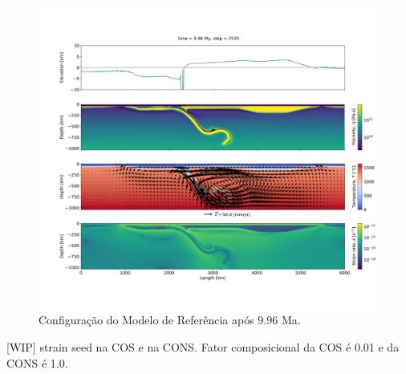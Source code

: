 \begin{figure}
    \centering
    \includegraphics[trim={5cm 14cm 2cm 12cm}, clip, width=1.0 \textwidth]{fig/strak_32-11.png}
    \caption{Configuração do Modelo de Referência após $9.96$ Ma.}
    \label{fig:fim-referencia}
\end{figure}

[WIP] strain seed na COS e na CONS. Fator composicional da COS é 0.01 e da CONS é 1.0.








